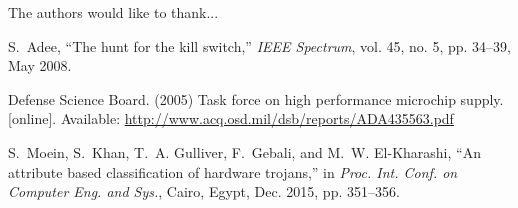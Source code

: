 \documentclass[journal, hidelinks]{IEEEtran}
\begin{document}
%
%
%


The authors would like to thank...


\ifCLASSOPTIONcaptionsoff
  \newpage
\fi




\begin{thebibliography}{1}


S.~Adee,
``The hunt for the kill switch,''
{\em IEEE Spectrum},
vol. 45, no. 5, pp. 34--39, May 2008.

Defense Science Board. (2005)
Task force on high performance microchip supply.
[online]. Available: \url{http://www.acq.osd.mil/dsb/reports/ADA435563.pdf}

S.~Moein, S.~Khan, T.~A. Gulliver, F.~Gebali, and M.~W. El-Kharashi,
``An attribute based classification of hardware trojans,''
in {\em Proc. Int. Conf. on Computer Eng. and Sys.}, Cairo, Egypt, Dec. 2015, pp. 351--356.


\end{thebibliography}

% 
\end{document}

